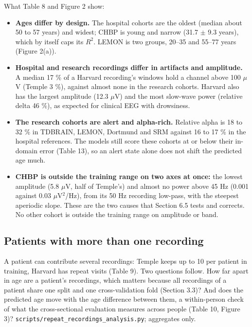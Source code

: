 \documentclass[11pt,a4paper]{article}
\begin{document}
What Table 8 and Figure 2 show:

\begin{itemize}
\item \textbf{Ages differ by design.} The hospital cohorts are the oldest (median about 50 to 57 years) and widest; CHBP is young and narrow (31.7 $\pm$ 9.3 years), which by itself caps its $R^2$. LEMON is two groups, 20--35 and 55--77 years (Figure 2(a)).
\item \textbf{Hospital and research recordings differ in artifacts and amplitude.} A median 17 \% of a Harvard recording's windows hold a channel above 100 $\mu$V (Temple 3 \%), against almost none in the research cohorts. Harvard also has the largest amplitude (12.3 $\mu$V) and the most slow-wave power (relative delta 46 \%), as expected for clinical EEG with drowsiness.
\item \textbf{The research cohorts are alert and alpha-rich.} Relative alpha is 18 to 32 \% in TDBRAIN, LEMON, Dortmund and SRM against 16 to 17 \% in the hospital references. The models still score these cohorts at or below their in-domain error (Table 13), so an alert state alone does not shift the predicted age much.
\item \textbf{CHBP is outside the training range on two axes at once:} the lowest amplitude (5.8 $\mu$V, half of Temple's) and almost no power above 45 Hz (0.001 against 0.03 $\mu$V$^2$/Hz), from its 50 Hz recording low-pass, with the steepest aperiodic slope. These are the two causes that Section 6.5 tests and corrects. No other cohort is outside the training range on amplitude or band.
\end{itemize}

\subsection{Patients with more than one recording}

A patient can contribute several recordings: Temple keeps up to 10 per patient in training, Harvard has repeat visits (Table 9). Two questions follow. How far apart in age are a patient's recordings, which matters because all recordings of a patient share one split and one cross-validation fold (Section 3.3)? And does the predicted age move with the age difference between them, a within-person check of what the cross-sectional evaluation measures across people (Table 10, Figure 3)? \texttt{scripts/repeat\_recordings\_analysis.py}; aggregates only.
\end{document}
